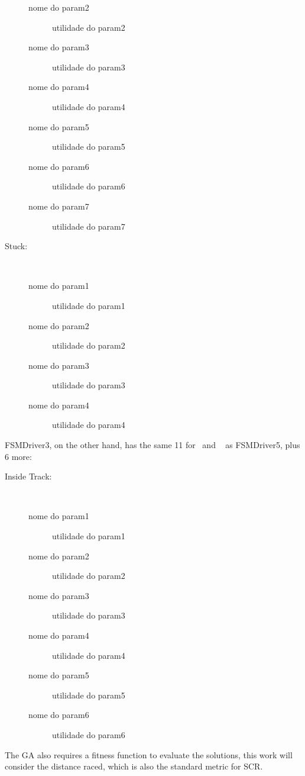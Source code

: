 \begin{description}
\begin{description}
		\item[nome do param2] utilidade do param2
		\item[nome do param3] utilidade do param3
		\item[nome do param4] utilidade do param4
		\item[nome do param5] utilidade do param5
		\item[nome do param6] utilidade do param6
		\item[nome do param7] utilidade do param7
	\end{description}
	\item[Stuck:] \ %
	\begin{description}
		\item[nome do param1] utilidade do param1
		\item[nome do param2] utilidade do param2
		\item[nome do param3] utilidade do param3
		\item[nome do param4] utilidade do param4
	\end{description}
\end{description}

FSMDriver3, on the other hand, has the same 11 for \Ot~and \St~ as FSMDriver5, plus 6 more:

\begin{description}
	\item[Inside Track:] \ %
	\begin{description}
		\item[nome do param1] utilidade do param1
		\item[nome do param2] utilidade do param2
		\item[nome do param3] utilidade do param3
		\item[nome do param4] utilidade do param4
		\item[nome do param5] utilidade do param5
		\item[nome do param6] utilidade do param6
	\end{description}
\end{description}

The GA also requires a fitness function to evaluate the solutions, this work will consider the distance raced, which is also the standard metric for SCR.


